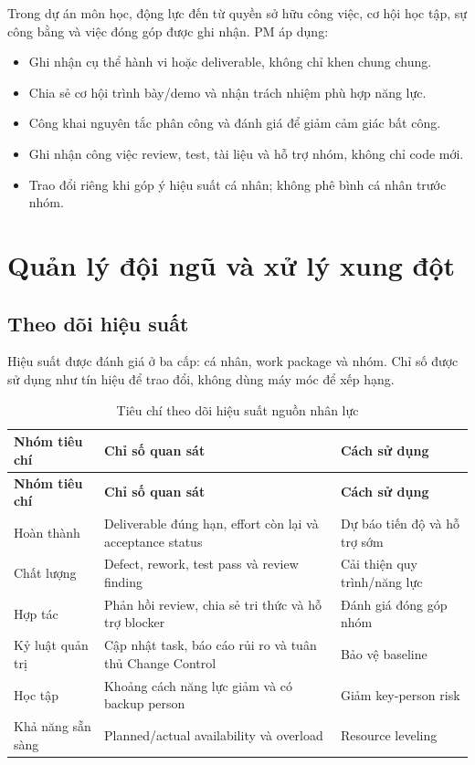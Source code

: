 Trong dự án môn học, động lực đến từ quyền sở hữu công việc, cơ hội học tập, sự công bằng và việc đóng góp được ghi nhận. PM áp dụng:

\begin{itemize}
  \item Ghi nhận cụ thể hành vi hoặc deliverable, không chỉ khen chung chung.
  \item Chia sẻ cơ hội trình bày/demo và nhận trách nhiệm phù hợp năng lực.
  \item Công khai nguyên tắc phân công và đánh giá để giảm cảm giác bất công.
  \item Ghi nhận công việc review, test, tài liệu và hỗ trợ nhóm, không chỉ code mới.
  \item Trao đổi riêng khi góp ý hiệu suất cá nhân; không phê bình cá nhân trước nhóm.
\end{itemize}

\section{Quản lý đội ngũ và xử lý xung đột}

\subsection{Theo dõi hiệu suất}

Hiệu suất được đánh giá ở ba cấp: cá nhân, work package và nhóm. Chỉ số được sử dụng như tín hiệu để trao đổi, không dùng máy móc để xếp hạng.

\begin{longtable}{| p{3.5cm} | p{5.7cm} | p{4.5cm} |}
\caption{Tiêu chí theo dõi hiệu suất nguồn nhân lực}\label{tab:performance-criteria}\\
\hline
\textbf{Nhóm tiêu chí} & \textbf{Chỉ số quan sát} & \textbf{Cách sử dụng} \\
\hline
\endfirsthead
\hline
\textbf{Nhóm tiêu chí} & \textbf{Chỉ số quan sát} & \textbf{Cách sử dụng} \\
\hline
\endhead
Hoàn thành & Deliverable đúng hạn, effort còn lại và acceptance status & Dự báo tiến độ và hỗ trợ sớm \\ \hline
Chất lượng & Defect, rework, test pass và review finding & Cải thiện quy trình/năng lực \\ \hline
Hợp tác & Phản hồi review, chia sẻ tri thức và hỗ trợ blocker & Đánh giá đóng góp nhóm \\ \hline
Kỷ luật quản trị & Cập nhật task, báo cáo rủi ro và tuân thủ Change Control & Bảo vệ baseline \\ \hline
Học tập & Khoảng cách năng lực giảm và có backup person & Giảm key-person risk \\ \hline
Khả năng sẵn sàng & Planned/actual availability và overload & Resource leveling \\
\hline
\end{longtable}

